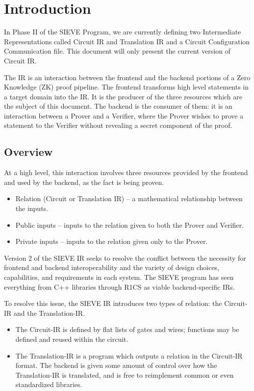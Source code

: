 \section{Introduction}\label{sec:intro}

In Phase II of the SIEVE Program, we are currently defining two Intermediate Representations
called Circuit IR and Translation IR and a Circuit Configuration Communication file.
This document will only present the current version of Circuit IR.

The IR is an interaction between the frontend and the backend portions of a Zero Knowledge (ZK) proof pipeline.
The frontend transforms high level statements in a target domain into the IR.
It is the producer of the three resources which are the subject of this document.
The backend is the consumer of them: it is an interaction between a Prover and a Verifier, where the Prover wishes to prove a statement to the Verifier without revealing a secret component of the proof.

\subsection{Overview}

At a high level, this interaction involves three resources provided by the frontend and used by the backend, as the fact is being proven. \\

\begin{itemize}
  \item Relation (Circuit or Translation IR) -- a mathematical relationship between the inputs.
  \item Public inputs -- inputs to the relation given to both the Prover and Verifier.
  \item Private inputs -- inputs to the relation given only to the Prover.
\end{itemize}

Version 2 of the SIEVE IR seeks to resolve the conflict between the necessity for frontend and backend interoperability and the variety of design choices, capabilities, and requirements in each system.
The SIEVE program has seen everything from C++ libraries through R1CS as viable backend-specific IRs.

To resolve this issue, the SIEVE IR introduces two types of relation: the Circuit-IR and the Translation-IR.
\begin{itemize}
\item The Circuit-IR is defined by flat lists of gates and wires; functions may be defined and reused within the circuit.
\item The Translation-IR is a program which outputs a relation in the Circuit-IR format.
The backend is given some amount of control over how the Translation-IR is translated, and is free to reimplement common or even standardized libraries.
\end{itemize}

